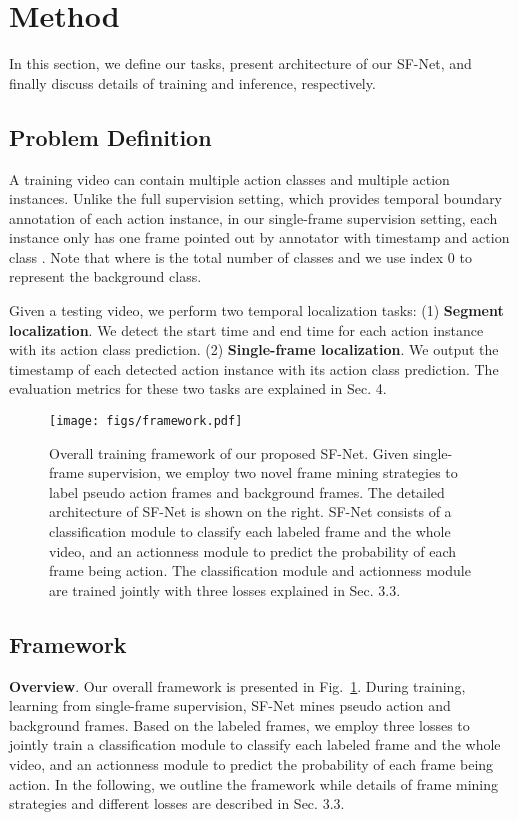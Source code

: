 \documentclass[runningheads]{llncs}
\begin{document}
	
	\section{Method}
	In this section, we define our tasks, present architecture of our SF-Net, and finally discuss details of training and inference, respectively.
	
	
	\subsection{Problem Definition}
	A training video can contain multiple action classes and multiple action instances.
	Unlike the full supervision setting, which provides temporal boundary annotation of each action instance, in our single-frame supervision setting, each instance only has one frame pointed out by annotator with timestamp  and action class . 
	Note that  where  is the total number of classes and we use index 0 to represent the background class.
	
	Given a testing video, we perform two temporal localization tasks: (1) \textbf{Segment localization}. We detect the start time and end time for each action instance with its action class prediction.
	(2) \textbf{Single-frame localization}. We output the timestamp of each detected action instance with its action class prediction.
	The evaluation metrics for these two tasks are explained in Sec. 4.
	
	
	
	\begin{figure}[!t]
		\centering
		\texttt{[image: figs/framework.pdf]}
		\caption{Overall training framework of our proposed SF-Net.
			Given single-frame supervision, we employ two novel frame mining strategies to label pseudo action frames and background frames.
			The detailed architecture of SF-Net is shown on the right.
			SF-Net consists of a classification module to classify each labeled frame and the whole video, and an actionness module to predict the probability of each frame being action.
			The classification module and actionness module are trained jointly with three losses explained in Sec. 3.3.
}
		\label{fig:framework}
	\end{figure}
	
	
	\subsection{Framework}
	
	\textbf{Overview}. Our overall framework is presented in Fig.~\ref{fig:framework}. During training, learning from single-frame supervision, SF-Net mines pseudo action and background frames. Based on the labeled frames, we employ three losses to jointly train a classification module to classify each labeled frame and the whole video, and an actionness module to predict the probability of each frame being action. In the following, we outline the framework while details of frame mining strategies and different losses are described in Sec. 3.3.
	
\end{document}
